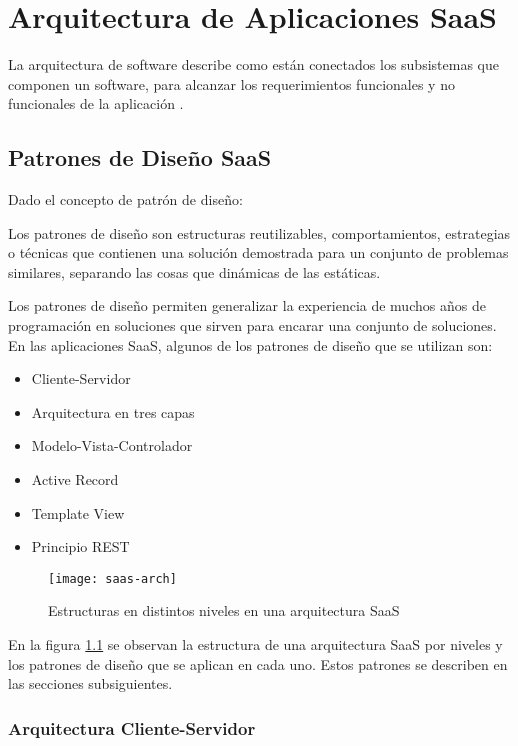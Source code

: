 \chapter{Arquitectura de Aplicaciones SaaS}
La arquitectura de software describe como están conectados los subsistemas que componen un software, para alcanzar los requerimientos funcionales y no funcionales de la aplicación \cite{Fox2013-ct}.

\section{Patrones de Diseño SaaS} 
Dado el concepto de patrón de diseño:
\begin{displayquote}
Los patrones de diseño son estructuras reutilizables, comportamientos, estrategias o técnicas que contienen una solución demostrada para un conjunto de problemas similares, separando las cosas que dinámicas de las estáticas.
\cite{Fox2013-ct}
\end{displayquote}
    
    Los patrones de diseño permiten generalizar la experiencia de muchos años de programación en soluciones que sirven para encarar una conjunto de soluciones. 
    En las aplicaciones SaaS, algunos de los patrones de diseño que se utilizan son:
\begin{itemize}
    \item Cliente-Servidor
    \item Arquitectura en tres capas
    \item Modelo-Vista-Controlador
    \item Active Record
    \item Template View
    \item Principio REST
\end{itemize}


    \begin{figure}[H]
        \centering
        \texttt{[image: saas-arch]}
        \caption{Estructuras en distintos niveles en una arquitectura SaaS \protect\cite{Fox2013-ct}}
        \label{fig:saas-arch}
    \end{figure}

En la figura \ref{fig:saas-arch} se observan la estructura de una arquitectura SaaS por niveles y los patrones de diseño que se aplican en cada uno. Estos patrones se describen en las secciones subsiguientes.
\subsection{Arquitectura Cliente-Servidor}
    
